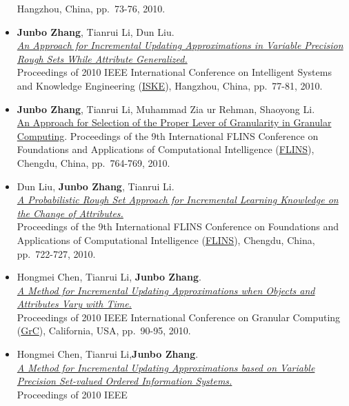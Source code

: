 \documentclass[]{article}
\begin{document}
\begin{itemize}
  Hangzhou, China, pp.~73-76, 2010.
\item
  \textbf{Junbo Zhang}, Tianrui Li, Dun Liu.\\
  \href{http://dx.doi.org/10.1109/ISKE.2010.5680798}{\emph{An Approach
  for Incremental Updating Approximations in Variable Precision Rough
  Sets While Attribute Generalized.}}\\ Proceedings of 2010 IEEE
  International Conference on Intelligent Systems and Knowledge
  Engineering
  (\href{http://ieeexplore.ieee.org/xpl/mostRecentIssue.jsp?punumber=5676709}{ISKE}),
  Hangzhou, China, pp.~77-81, 2010.
\item
  \textbf{Junbo Zhang}, Tianrui Li, Muhammad Zia ur Rehman, Shaoyong
  Li.\\ \href{http://dx.doi.org/10.1142/9789814324700_0116}{An Approach
  for Selection of the Proper Lever of Granularity in Granular
  Computing}. Proceedings of the 9th International FLINS Conference on
  Foundations and Applications of Computational Intelligence
  (\href{http://www.wikicfp.com/cfp/servlet/event.showcfp?eventid=7359\&copyownerid=2}{FLINS}),
  Chengdu, China, pp.~764-769, 2010.
\item
  Dun Liu, \textbf{Junbo Zhang}, Tianrui Li.\\
  \href{http://dx.doi.org/10.1142/9789814324700_0109}{\emph{A
  Probabilistic Rough Set Approach for Incremental Learning Knowledge on
  the Change of Attributes.}}\\ Proceedings of the 9th International
  FLINS Conference on Foundations and Applications of Computational
  Intelligence
  (\href{http://www.wikicfp.com/cfp/servlet/event.showcfp?eventid=7359\&copyownerid=2}{FLINS}),
  Chengdu, China, pp.~722-727, 2010.
\item
  Hongmei Chen, Tianrui Li, \textbf{Junbo Zhang}.\\
  \href{http://dx.doi.org/10.1109/GrC.2010.116}{\emph{A Method for
  Incremental Updating Approximations when Objects and Attributes Vary
  with Time.}}\\ Proceedings of 2010 IEEE International Conference on
  Granular Computing
  (\href{http://xanadu.cs.sjsu.edu/~grc/grc2010}{GrC}), California, USA,
  pp.~90-95, 2010.
\item
  Hongmei Chen, Tianrui Li,\textbf{Junbo Zhang}.\\
  \href{http://dx.doi.org/10.1109/GrC.2010.115}{\emph{A Method for
  Incremental Updating Approximations based on Variable Precision
  Set-valued Ordered Information Systems.}}\\ Proceedings of 2010 IEEE

\end{itemize}
\end{document}
